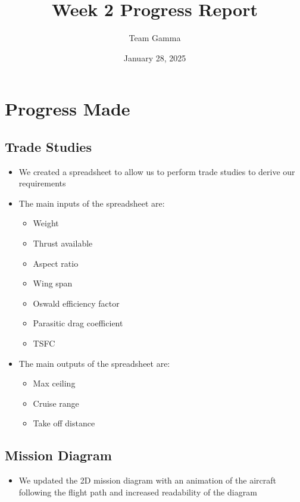\documentclass[10pt,twocolumn]{article}  %
\title{Week 2 Progress Report}
\author{Team Gamma}
\date{January 28, 2025}
\begin{document}
\maketitle
\section{Progress Made}\label{progress-made}

\subsection{Trade Studies}\label{trade-studies}

\begin{itemize}
\tightlist
\item
  We created a spreadsheet to allow us to perform trade studies to
  derive our requirements
\item
  The main inputs of the spreadsheet are:

  \begin{itemize}
  \tightlist
  \item
    Weight
  \item
    Thrust available
  \item
    Aspect ratio
  \item
    Wing span
  \item
    Oswald efficiency factor
  \item
    Parasitic drag coefficient
  \item
    TSFC
  \end{itemize}
\item
  The main outputs of the spreadsheet are:

  \begin{itemize}
  \tightlist
  \item
    Max ceiling
  \item
    Cruise range
  \item
    Take off distance
  \end{itemize}
\end{itemize}

\subsection{Mission Diagram}\label{mission-diagram}

\begin{itemize}
\tightlist
\item
  We updated the 2D mission diagram with an animation of the aircraft
  following the flight path and increased readability of the diagram
\end{itemize}
\end{document}
